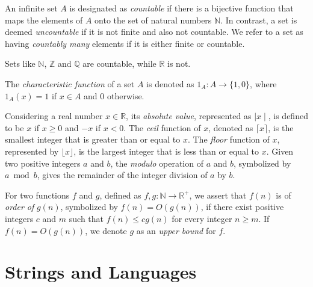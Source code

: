 An infinite set $A$ is designated as \emph{countable} if there is a bijective function that maps the elements of $A$ onto the set of natural numbers $\mathbb{N}$. In contrast, a set is deemed \emph{uncountable} if it is not finite and also not countable. We refer to a set as having \emph{countably many} elements if it is either finite or countable.

\begin{example}
Sets like $\mathbb{N}$, $\mathbb{Z}$ and $\mathbb{Q}$ are countable, while $\mathbb{R}$ is not.
\end{example}

The \emph{characteristic function} of a set $A$ is denoted as $1_A : A \rightarrow \{1, 0\}$, where $1_A(x) = 1$ if $x \in A$ and $0$ otherwise.

Considering a real number $x \in \mathbb{R}$, its \emph{absolute value}, represented as $\mid x \mid$, is defined to be $x$ if $x \geq 0$ and $-x$ if $x < 0$. The \emph{ceil} function of $x$, denoted as $\lceil x \rceil$, is the smallest integer that is greater than or equal to $x$. The \emph{floor} function of $x$, represented by $\lfloor x \rfloor$, is the largest integer that is less than or equal to $x$. Given two positive integers $a$ and $b$, the \emph{modulo} operation of $a$ and $b$, symbolized by $a \bmod b$, gives the remainder of the integer division of $a$ by $b$.

For two functions $f$ and $g$, defined as $f,g:\mathbb{N}\rightarrow\mathbb{R}^{+}$, we assert that $f(n)$ is of \emph{order of} $g(n)$, symbolized by $f(n)=O(g(n))$, if there exist positive integers $c$ and $m$ such that $f(n)\leq cg(n)$ for every integer $n \geq m$. If $f(n)=O(g(n))$, we denote $g$ as an \emph{upper bound} for $f$.

%
%

\section{Strings and Languages}
\label{sec:strings}

